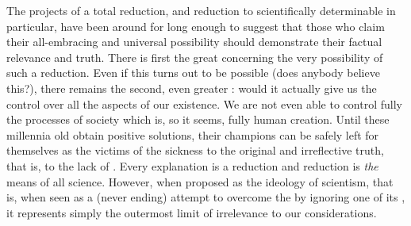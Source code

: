 The projects of a total reduction, and reduction to scientifically determinable
 in particular, have been around for long enough to suggest that
those who claim their all-embracing and universal possibility should demonstrate
their factual relevance and truth. There is first the great  concerning
the very possibility of such a reduction. Even if this turns out to be possible
(does anybody believe this?), there remains the second, even greater :
would it actually give us the control over all the aspects of our existence. We
are not even able to control fully the processes of society which is, so it
seems, fully human creation.  Until these millennia old  obtain positive
solutions, their champions can be safely left for themselves as the victims of
the  sickness to the {original and irreflective truth}, that is,
to the lack of . Every explanation is a reduction and
reduction is {\em the} means of all science. However, when proposed as the
ideology of scientism, that is, when seen as a (never ending) attempt to
overcome the  by ignoring one of its , it
represents simply the outermost limit of irrelevance to our considerations.


